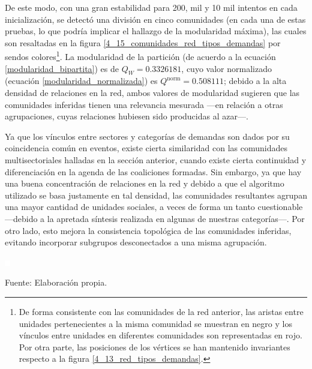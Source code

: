 \documentclass[letterpaper, 11pt]{book}
\theoremstyle{definition}
\theoremstyle{remark}
\begin{document}
De este modo, con una gran estabilidad para 200, mil y 10 mil intentos en cada inicialización, se detectó una división en cinco comunidades (en cada una de estas pruebas, lo que podría implicar el hallazgo de la modularidad máxima), las cuales son resaltadas en la figura \ref{4_15_comunidades_red_tipos_demandas} por sendos colores\footnote{
    De forma consistente con las comunidades de la red anterior, las aristas entre unidades pertenecientes a la misma comunidad se muestran en negro y los vínculos entre unidades en diferentes comunidades son representadas en rojo. 
    Por otra parte, las posiciones de los vértices se han mantenido invariantes respecto a la figura \ref{4_13_red_tipos_demandas}.
}. 
La modularidad de la partición (de acuerdo a la ecuación \ref{modularidad_bipartita}) es de $Q_{W} = 0.3326181$, cuyo valor normalizado (ecuación \ref{modularidad_normalizada}) es $Q^{\text{norm}} = 0.508111$; debido a la alta densidad de relaciones en la red, ambos valores de modularidad sugieren que las comunidades inferidas tienen una relevancia mesurada ---en relación a otras agrupaciones, cuyas relaciones hubiesen sido producidas al azar---. 



Ya que los vínculos entre sectores y categorías de demandas son dados por su coincidencia común en eventos, existe cierta similaridad con las comunidades multisectoriales halladas en la sección anterior, cuando existe cierta continuidad y diferenciación en la agenda de las coaliciones formadas. 
Sin embargo, ya que hay una buena concentración de relaciones en la red y debido a que el algoritmo utilizado se basa justamente en tal densidad, las comunidades resultantes agrupan una mayor cantidad de unidades sociales, a veces de forma un tanto cuestionable ---debido a la apretada síntesis realizada en algunas de nuestras categorías---. 
Por otro lado, esto mejora la consistencia topológica de las comunidades inferidas, evitando incorporar subgrupos desconectados a una misma agrupación. 


\pagebreak
\begin{minipage}{\linewidth}
\centering
{} \label{4_15_comunidades_red_tipos_demandas}

\includegraphics[scale=0.1]{img/null.png}
\vspace{48em}
\par\bigskip
\small Fuente: Elaboración propia.
\end{minipage}\bigskip
\end{document}
